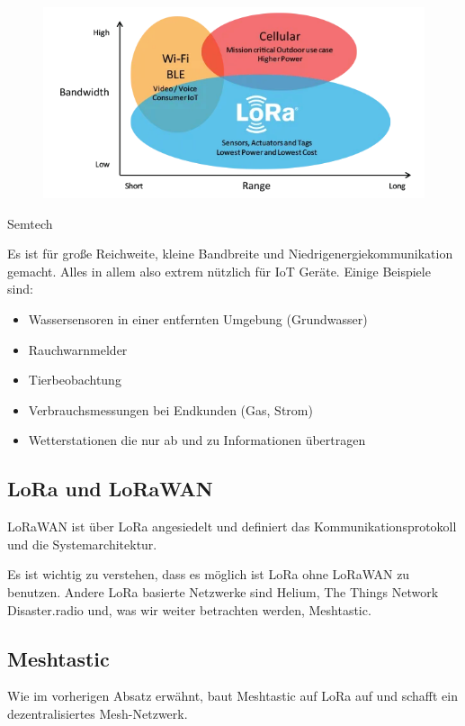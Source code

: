 \documentclass[12pt,a4paper]{article}
\begin{document}
\begin{figure}
	\includegraphics[scale=0.7]{bandwidth-vs-range.png}
\end{figure}
Semtech

Es ist für große Reichweite, kleine Bandbreite und Niedrigenergiekommunikation gemacht. Alles in allem also extrem nützlich für IoT Geräte. Einige Beispiele sind:

\begin{itemize}
	\item Wassersensoren in einer entfernten Umgebung (Grundwasser)
	\item Rauchwarnmelder
	\item Tierbeobachtung
	\item Verbrauchsmessungen bei Endkunden (Gas, Strom)
	\item Wetterstationen die nur ab und zu Informationen übertragen
\end{itemize}

\subsection{LoRa und LoRaWAN}

LoRaWAN ist über LoRa angesiedelt und definiert das Kommunikationsprotokoll und die Systemarchitektur.

Es ist wichtig zu verstehen, dass es möglich ist LoRa ohne LoRaWAN zu benutzen. Andere LoRa basierte Netzwerke sind Helium, The Things Network Disaster.radio und, was wir weiter betrachten werden, Meshtastic.

\subsection{Meshtastic}
Wie im vorherigen Absatz erwähnt, baut Meshtastic auf LoRa auf und schafft ein dezentralisiertes Mesh-Netzwerk.
\end{document}

